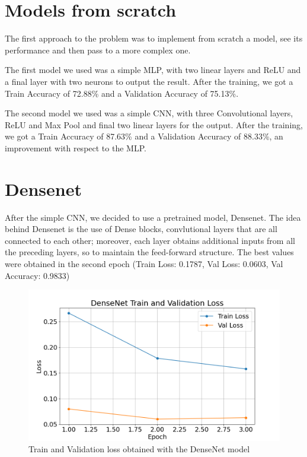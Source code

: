 \documentclass[11pt,journal]{IEEEtran}
\newcommand{\nl}{

\medskip

}
\begin{document}
\section{Models from scratch}
The first approach to the problem was to implement from scratch a model, see its performance and then pass to a more complex one. \nl
The first model we used was a simple MLP\cite{MLP}, with two linear layers and ReLU and a final layer with two neurons to output the result. After the training, we got a Train Accuracy of 72.88\% and a Validation Accuracy of 75.13\%.\nl
The second model we used was a simple CNN\cite{CNN}, with three Convolutional layers, ReLU and Max Pool and final two linear layers for the output. After the training, we got a Train Accuracy of 87.63\% and a Validation Accuracy of 88.33\%, an improvement with respect to the MLP. \nl

\section{Densenet}
After the simple CNN, we decided to use a pretrained model, Densenet. The idea behind Densenet is the use of Dense blocks, convlutional layers that are all connected to each other; moreover, each layer obtains additional inputs from all the preceding layers, so to maintain the feed-forward structure.
The best values were obtained in the second epoch (Train Loss: 0.1787, Val Loss: 0.0603, Val Accuracy: 0.9833)

\begin{figure}[ht]
	\renewcommand{\arraystretch}{2.0}
	\label{DenseNet_TrainVal_Loss}
	\centering
	\includegraphics[width=\linewidth]{DenseNet_TrainVal_Loss}
	\caption{Train and Validation loss obtained with the DenseNet model}
\end{figure}
\end{document}
